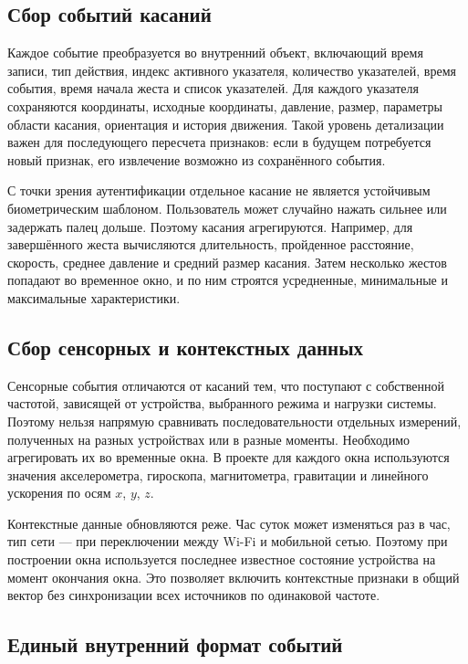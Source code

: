 \documentclass[oneside,senior,etd]{BYUPhys}
\begin{document}
\subsection{Сбор событий касаний}

Каждое событие преобразуется во внутренний объект, включающий время записи, тип действия, индекс активного указателя, количество указателей, время события, время начала жеста и список указателей. Для каждого указателя сохраняются координаты, исходные координаты, давление, размер, параметры области касания, ориентация и история движения. Такой уровень детализации важен для последующего пересчета признаков: если в будущем потребуется новый признак, его извлечение возможно из сохранённого события.

С точки зрения аутентификации отдельное касание не является устойчивым биометрическим шаблоном. Пользователь может случайно нажать сильнее или задержать палец дольше. Поэтому касания агрегируются. Например, для завершённого жеста вычисляются длительность, пройденное расстояние, скорость, среднее давление и средний размер касания. Затем несколько жестов попадают во временное окно, и по ним строятся усредненные, минимальные и максимальные характеристики.

\subsection{Сбор сенсорных и контекстных данных}

Сенсорные события отличаются от касаний тем, что поступают с собственной частотой, зависящей от устройства, выбранного режима и нагрузки системы. Поэтому нельзя напрямую сравнивать последовательности отдельных измерений, полученных на разных устройствах или в разные моменты. Необходимо агрегировать их во временные окна. В проекте для каждого окна используются значения акселерометра, гироскопа, магнитометра, гравитации и линейного ускорения по осям $x$, $y$, $z$.

Контекстные данные обновляются реже. Час суток может изменяться раз в час, тип сети --- при переключении между Wi-Fi и мобильной сетью. Поэтому при построении окна используется последнее известное состояние устройства на момент окончания окна. Это позволяет включить контекстные признаки в общий вектор без синхронизации всех источников по одинаковой частоте.

\subsection{Единый внутренний формат событий}
\end{document}
